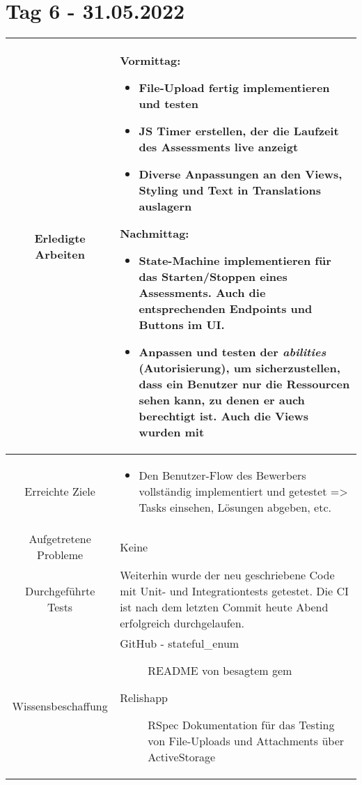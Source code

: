 \section{Tag 6 - 31.05.2022}

\begin{tabularx}{\textwidth}[H]{|c|X|}
    \hline
    Erledigte Arbeiten         &
    \textbf{Vormittag:}
    \begin{itemize}
        \item File-Upload fertig implementieren und testen
        \item JS Timer erstellen, der die Laufzeit des Assessments live anzeigt 
        \item Diverse Anpassungen an den Views, Styling und Text in Translations auslagern
    \end{itemize}
    \textbf{Nachmittag:}
    \begin{itemize}
        \item State-Machine implementieren für das Starten/Stoppen eines Assessments. Auch die entsprechenden Endpoints und Buttons im UI.
        \item Anpassen und testen der \emph{abilities} (Autorisierung), um sicherzustellen, dass ein Benutzer
              nur die Ressourcen sehen kann, zu denen er auch berechtigt ist. Auch die Views wurden mit 
    \end{itemize}
    \\ \hline

    Erreichte Ziele            &
    \begin{itemize}
        \item Den Benutzer-Flow des Bewerbers vollständig implementiert und getestet => Tasks einsehen, Lösungen abgeben, etc.
    \end{itemize}
    \\ \hline

    Aufgetretene Probleme      &
    Keine
    \\ \hline

    Durchgeführte Tests        &
    Weiterhin wurde der neu geschriebene Code mit Unit- und Integrationtests getestet. Die CI ist nach dem letzten Commit heute Abend erfolgreich durchgelaufen.
    \\ \hline

    Wissensbeschaffung         &
    \begin{description}
        \item[GitHub - stateful\_enum] README von besagtem gem
        \item[Relishapp] RSpec Dokumentation für das Testing von File-Uploads und Attachments über ActiveStorage
    \end{description}
    \\ \hline


\end{tabularx}
